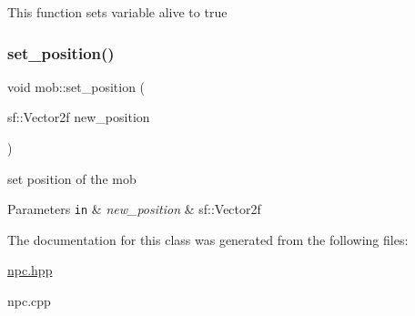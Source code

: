 This function sets variable alive to true \mbox{\label{classmob_a6556e84e416fd496450d18dd1d0eb1f2}} 
\subsubsection{\texorpdfstring{set\+\_\+position()}{set\_position()}}
{\footnotesize\ttfamily void mob\+::set\+\_\+position (\begin{DoxyParamCaption}\item[{sf\+::\+Vector2f}]{new\+\_\+position }\end{DoxyParamCaption})}



set position of the mob 


\begin{DoxyParams}[1]{Parameters}
\mbox{\tt in}  & {\em new\+\_\+position} & sf\+::\+Vector2f \\
\hline
\end{DoxyParams}


The documentation for this class was generated from the following files\+:\begin{DoxyCompactItemize}
\item 
\hyperlink{npc_8hpp}{npc.\+hpp}\item 
npc.\+cpp\end{DoxyCompactItemize}
